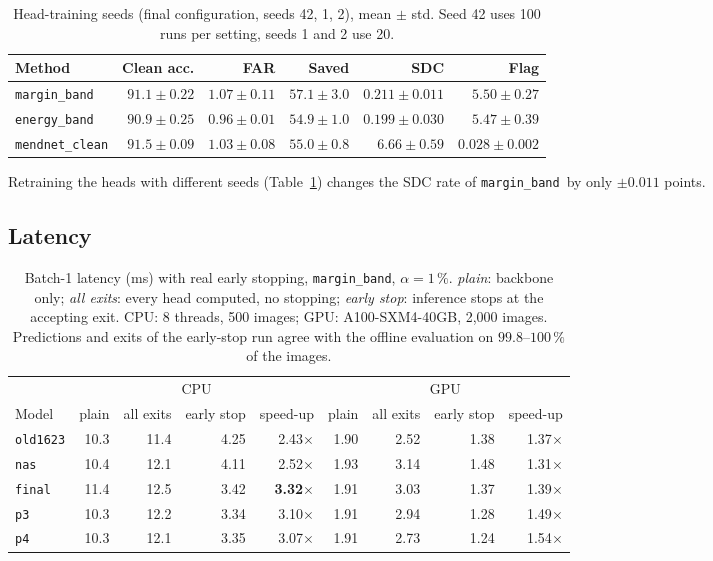 \documentclass[10pt,a4paper]{article}
\newcommand{\meth}[1]{\texttt{#1}}
\newcommand{\ours}{\meth{margin\_band}}
\begin{document}
\begin{table}[H]
\centering\small
\caption{Head-training seeds (final configuration, seeds 42, 1, 2), mean $\pm$ std. Seed 42 uses 100 runs per
setting, seeds 1 and 2 use 20.}
\label{tab:seeds}
\begin{adjustbox}{max width=\linewidth}
\begin{tabular}{@{}lrrrrr@{}}
\toprule
Method & Clean acc. & FAR & Saved & SDC & Flag \\
\midrule
\ours\              & $91.1\pm0.22$ & $1.07\pm0.11$ & $57.1\pm3.0$ & $0.211\pm0.011$ & $5.50\pm0.27$ \\
\meth{energy\_band} & $90.9\pm0.25$ & $0.96\pm0.01$ & $54.9\pm1.0$ & $0.199\pm0.030$ & $5.47\pm0.39$ \\
\meth{mendnet\_clean} & $91.5\pm0.09$ & $1.03\pm0.08$ & $55.0\pm0.8$ & $6.66\pm0.59$ & $0.028\pm0.002$ \\
\bottomrule
\end{tabular}
\end{adjustbox}
\end{table}

Retraining the heads with different seeds (Table~\ref{tab:seeds}) changes the SDC rate of \ours\ by only
$\pm0.011$ points.

\subsection{Latency}

\begin{table}[H]
\centering\small
\caption{Batch-1 latency (ms) with real early stopping, \ours, $\alpha=1\,\%$. \emph{plain}: backbone only;
\emph{all exits}: every head computed, no stopping; \emph{early stop}: inference stops at the accepting exit.
CPU: 8 threads, 500 images; GPU: A100-SXM4-40GB, 2{,}000 images. Predictions and exits of the early-stop run
agree with the offline evaluation on $99.8$--$100\,\%$ of the images.}
\label{tab:latency}
\begin{adjustbox}{max width=\linewidth}
\begin{tabular}{@{}l rrrr rrrr@{}}
\toprule
 & \multicolumn{4}{c}{CPU} & \multicolumn{4}{c}{GPU} \\
\cmidrule(lr){2-5}\cmidrule(l){6-9}
Model & plain & all exits & early stop & speed-up & plain & all exits & early stop & speed-up \\
\midrule
\meth{old1623} & 10.3 & 11.4 & 4.25 & 2.43$\times$ & 1.90 & 2.52 & 1.38 & 1.37$\times$ \\
\meth{nas}     & 10.4 & 12.1 & 4.11 & 2.52$\times$ & 1.93 & 3.14 & 1.48 & 1.31$\times$ \\
\meth{final}   & 11.4 & 12.5 & 3.42 & \textbf{3.32}$\times$ & 1.91 & 3.03 & 1.37 & 1.39$\times$ \\
\meth{p3}      & 10.3 & 12.2 & 3.34 & 3.10$\times$ & 1.91 & 2.94 & 1.28 & 1.49$\times$ \\
\meth{p4}      & 10.3 & 12.1 & 3.35 & 3.07$\times$ & 1.91 & 2.73 & 1.24 & 1.54$\times$ \\
\bottomrule
\end{tabular}
\end{adjustbox}
\end{table}
\end{document}
